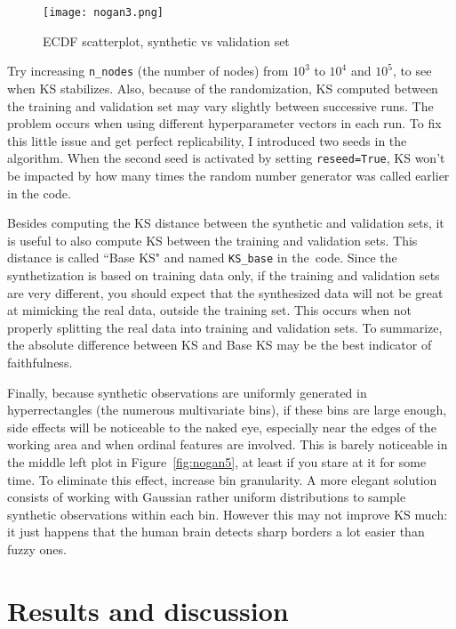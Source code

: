 \documentclass[oneside,10pt]{book}
\begin{document}
\begin{figure}[H]
\centering
\texttt{[image: nogan3.png]} %
\caption{ECDF scatterplot, synthetic vs validation set}
\label{fig:nogan3}
\end{figure}

Try increasing \texttt{n\_nodes} (the number of nodes) from $10^3$ to $10^4$ and $10^5$, to see when KS stabilizes.  Also, because of the randomization, KS computed between the training and validation set may vary slightly between successive runs.
The problem occurs when using different hyperparameter vectors in each run. To fix this little issue and get perfect replicability, I introduced two seeds in the algorithm. When the second seed is activated by setting \texttt{reseed=True}, KS won't be impacted by how many times the random number generator was called earlier in the code.

Besides computing the KS distance between the synthetic and validation sets, it is useful to also compute KS between the training and validation sets. This distance is called ``Base KS" and named \texttt{KS\_base} in the~code. Since the synthetization is based on training data only, if the training and validation sets are very different, you should expect that the synthesized data will not be great at mimicking the real data, outside the training set.
 This occurs when not properly splitting the real data into training and validation sets. To summarize, the absolute difference between
 KS and Base KS may be the best indicator of faithfulness.

Finally, because synthetic observations are uniformly generated in hyperrectangles (the numerous multivariate bins), if these bins are large enough, side effects will be noticeable to the naked eye, especially near the edges of the working area and when ordinal features are involved.
This is barely noticeable in the middle left plot
in Figure~\ref{fig:nogan5}, at least if you stare at it for some time. To eliminate this effect, increase bin granularity. A more elegant solution consists
 of working with Gaussian rather uniform distributions to sample synthetic observations within each bin. However this may not improve KS much:
 it just happens that the human brain detects sharp borders a lot easier than fuzzy ones.




\section{Results and discussion}\label{hg4cvs}
\end{document}
